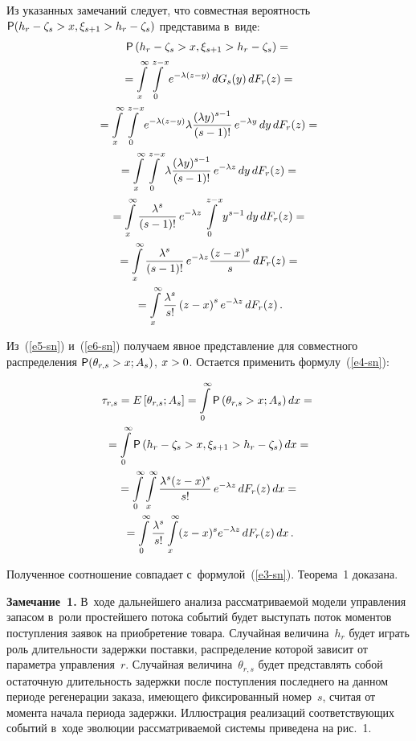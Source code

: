 \begin{multicols}{2}
  Из указанных замечаний следует, что совместная вероятность  ${\sf P}(h_r\hm- 
\zeta_s\hm> x, \xi_{s+1}\hm>h_r\hm-\zeta_s)$ пред\-ста\-ви\-ма в~виде:
  \begin{multline}
  {\sf P}\left( h_r-\zeta_s>x, \xi_{s+1}>h_r-\zeta_s\right) ={}\\
  {}=\int\limits_x^\infty 
\int\limits_0^{z-x} e^{-\lambda(z-y)}\,dG_s(y)\,dF_r(z)={}\\
  {}=\int\limits_x^{\infty} \int\limits_0^{z-x} e^{-\lambda(z-y)}\lambda 
\displaystyle\frac{\displaystyle (\lambda y)^{s-1}\mathstrut}{\displaystyle (s-1)!\mathstrut}\,e^{-\lambda y} \,dy \,dF_r(z)={}\\
  {}=\int\limits_x^{\infty} \int\limits_0^{z-x} \lambda \displaystyle\frac{\displaystyle (\lambda y)^{s-1}\mathstrut}{\displaystyle (s-
1)!\mathstrut}\, e^{-\lambda z}\,dy\,dF_r(z)={}\\
  {}=
  \int\limits_x^\infty \displaystyle\frac{\displaystyle \lambda^s\mathstrut}{\displaystyle (s-1)!\mathstrut}\,e^{-\lambda z} \int\limits_0^{z-x} 
y^{s-1}\,dy\,dF_r(z)={}\\
  {}= \int\limits_x^\infty \displaystyle\frac{\displaystyle \lambda^s\mathstrut}{\displaystyle (s-1)!\mathstrut}\,e^{-\lambda z} \displaystyle\frac{\displaystyle (z-
x)^s\mathstrut}{\displaystyle s\mathstrut}\,dF_r(z)={}\\
  {}= \int\limits_x^\infty \displaystyle\frac{\displaystyle \lambda^s\mathstrut}{\displaystyle s!\mathstrut}\left( z-x\right)^s e^{-\lambda z} \,
dF_r(z)\,.
  \label{e6-sn}
  \end{multline}
  
  Из~(\ref{e5-sn}) и~(\ref{e6-sn}) получаем явное пред\-став\-ле\-ние для 
совместного распределения ${\sf P}(\theta_{r,s}\hm>x;A_s)$, $x\hm>0$. Остается 
применить формулу~(\ref{e4-sn}):

\noindent
  \begin{multline*}
  \tau_{r,s}=E\left[ \theta_{r,s};A_s\right] =\int\limits_0^\infty {\sf P}\left( 
\theta_{r,s}>x;A_s\right)dx={}\\
  {}=\int\limits_0^\infty {\sf P}\left( h_r-\zeta_s>x, \xi_{s+1}>h_r-\zeta_s\right)dx={}
 \\
  {}= \int\limits_0^\infty \int\limits_x^\infty 
  \displaystyle\frac{\displaystyle \lambda^s(z-x)^s\mathstrut}{\displaystyle s!\mathstrut}\,e^{-\lambda z}\,dF_r(z)\,dx={}\\
{}= \int\limits_0^\infty \displaystyle\frac{\displaystyle \lambda^s\mathstrut}{\displaystyle s!\mathstrut} \int\limits_x^\infty (z-x)^s  e^{-\lambda z}\, dF_r(z)\,dx\,.
  \end{multline*}


  Полученное соотношение совпадает с~формулой~(\ref{e3-sn}). Теорема~1 
доказана.
  
  \smallskip
  

  
  \noindent
  \textbf{Замечание~1.} В~ходе дальнейшего анализа рассматриваемой 
модели управления запасом в~роли простейшего потока событий будет 
выступать поток моментов поступления заявок на приобретение товара. 
Случайная величина~$h_r$ будет играть роль длительности за\-держ\-ки по\-став\-ки, 
распределение которой зависит от па\-ра\-мет\-ра управ\-ле\-ния~$r$. Случайная 
величина~$\theta_{r,s}$ будет пред\-став\-лять собой остаточную дли\-тель\-ность 
задержки после по\-ступ\-ле\-ния последнего на данном периоде регенерации 
заказа, имеющего фиксированный номер~$s$, считая от момента начала периода 
за\-держ\-ки. Иллюстрация реализаций со\-от\-вет\-ст\-ву\-ющих событий в~ходе эволюции 
рассматриваемой сис\-те\-мы приведена на рис.~1.
  

\end{multicols}
